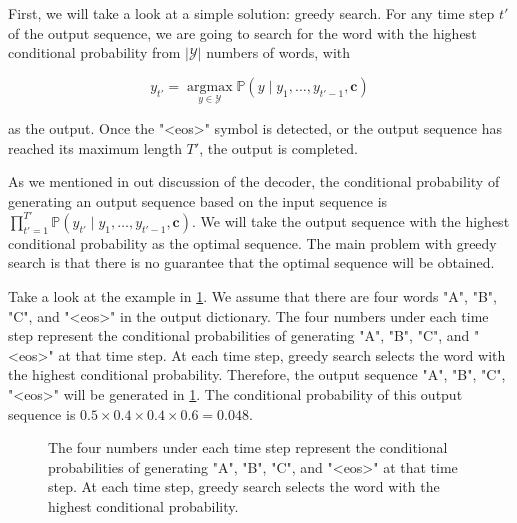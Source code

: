 
First, we will take a look at a simple solution: greedy search. For any time step $t'$ of the output sequence, we are going to search for the word with the highest conditional probability from $|\mathcal{Y}|$ numbers of words, with

$$y_{t'} = \operatorname*{argmax}_{y \in \mathcal{Y}} \mathbb{P}(y \mid y_1, \ldots, y_{t'-1}, \boldsymbol{c})$$

as the output.  Once the "<eos>" symbol is detected, or the output sequence has reached its maximum length $T'$, the output is completed.

As we mentioned in out discussion of the decoder, the conditional probability of generating an output sequence based on the input sequence is $\prod_{t'=1}^{T'} \mathbb{P}(y_{t'} \mid y_1, \ldots, y_{t'-1}, \boldsymbol{c})$. We will take the output sequence with the highest conditional probability as the optimal sequence. The main problem with greedy search is that there is no guarantee that the optimal sequence will be obtained.

Take a look at the example in \cref{fig:s2s_prob1}. We assume that there are four words "A", "B", "C", and "<eos>" in the output dictionary.  The four numbers under each time step represent the conditional probabilities of generating "A", "B", "C", and "<eos>" at that time step.  At each time step, greedy search selects the word with the highest conditional probability. Therefore, the output sequence "A", "B", "C", "<eos>" will be generated in \cref{fig:s2s_prob1}. The conditional probability of this output sequence is $0.5\times0.4\times0.4\times0.6 = 0.048$.


\begin{figure}[hpt]
	\centering
	
	\caption{The four numbers under each time step represent the conditional probabilities of generating "A", "B", "C", and "<eos>" at that time step. At each time step, greedy search selects the word with the highest conditional probability.}
	\label{fig:s2s_prob1}
\end{figure}


